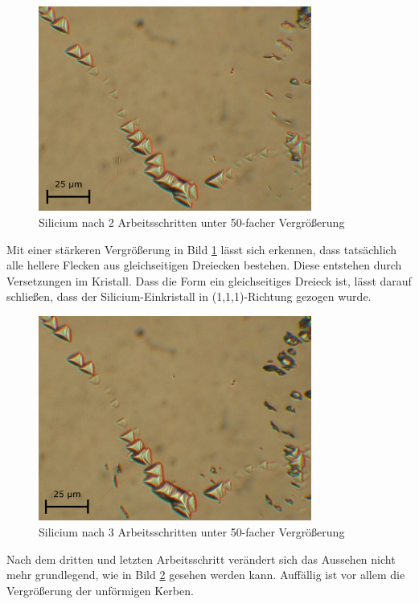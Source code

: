 \documentclass[german, %
parskip=full, %
bibliography=totoc, %
]{scrartcl}
\begin{document}
\begin{figure}[ht] 
  \centering
     \includegraphics[width=0.8\textwidth]{Silicium_2_50}
  \caption{Silicium nach 2 Arbeitsschritten unter 50-facher Vergrößerung}
  \label{fig:sil250}
\end{figure}

Mit einer stärkeren Vergrößerung in Bild \ref{fig:sil250} lässt sich erkennen, dass tatsächlich alle hellere Flecken aus gleichseitigen Dreiecken bestehen. Diese entstehen durch Versetzungen im Kristall. Dass die Form ein gleichseitiges Dreieck ist, lässt darauf schließen, dass der Silicium-Einkristall in (1,1,1)-Richtung gezogen wurde.

\begin{figure}[ht] 
  \centering
     \includegraphics[width=0.8\textwidth]{Silicium_3_50}
  \caption{Silicium nach 3 Arbeitsschritten unter 50-facher Vergrößerung}
  \label{fig:sil350}
\end{figure}

Nach dem dritten und letzten Arbeitsschritt verändert sich das Aussehen nicht mehr grundlegend, wie in Bild \ref{fig:sil350} gesehen werden kann. Auffällig ist vor allem die Vergrößerung der unförmigen Kerben. 
\end{document}
